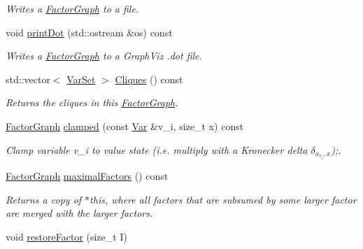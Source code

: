 \begin{CompactItemize}
\begin{CompactList}\small\item\em Writes a \hyperlink{classdai_1_1FactorGraph}{FactorGraph} to a file. \item\end{CompactList}\item 
\hypertarget{classdai_1_1FactorGraph_607c9a821e789121cf2ccbfacc5f8d5f}{
void \hyperlink{classdai_1_1FactorGraph_607c9a821e789121cf2ccbfacc5f8d5f}{printDot} (std::ostream \&os) const }
\label{classdai_1_1FactorGraph_607c9a821e789121cf2ccbfacc5f8d5f}

\begin{CompactList}\small\item\em Writes a \hyperlink{classdai_1_1FactorGraph}{FactorGraph} to a GraphViz .dot file. \item\end{CompactList}\item 
\hypertarget{classdai_1_1FactorGraph_9cd8cc192cac877725b2bae9f3e61a9f}{
std::vector$<$ \hyperlink{classdai_1_1VarSet}{VarSet} $>$ \hyperlink{classdai_1_1FactorGraph_9cd8cc192cac877725b2bae9f3e61a9f}{Cliques} () const }
\label{classdai_1_1FactorGraph_9cd8cc192cac877725b2bae9f3e61a9f}

\begin{CompactList}\small\item\em Returns the cliques in this \hyperlink{classdai_1_1FactorGraph}{FactorGraph}. \item\end{CompactList}\item 
\hyperlink{classdai_1_1FactorGraph}{FactorGraph} \hyperlink{classdai_1_1FactorGraph_915d21c0da8c2c1f342371bef6adb0f5}{clamped} (const \hyperlink{classdai_1_1Var}{Var} \&v\_\-i, size\_\-t x) const 
\begin{CompactList}\small\item\em Clamp variable v\_\-i to value state (i.e. multiply with a Kronecker delta $\delta_{x_{v_i},x}$);. \item\end{CompactList}\item 
\hypertarget{classdai_1_1FactorGraph_213527d7bcd00ccedce6276311332500}{
\hyperlink{classdai_1_1FactorGraph}{FactorGraph} \hyperlink{classdai_1_1FactorGraph_213527d7bcd00ccedce6276311332500}{maximalFactors} () const }
\label{classdai_1_1FactorGraph_213527d7bcd00ccedce6276311332500}

\begin{CompactList}\small\item\em Returns a copy of $\ast$this, where all factors that are subsumed by some larger factor are merged with the larger factors. \item\end{CompactList}\item 
\hypertarget{classdai_1_1FactorGraph_39ce217df7d9ea85b2b04b8d65101230}{
void \hyperlink{classdai_1_1FactorGraph_39ce217df7d9ea85b2b04b8d65101230}{restoreFactor} (size\_\-t I)}
\label{classdai_1_1FactorGraph_39ce217df7d9ea85b2b04b8d65101230}


\end{CompactItemize}
